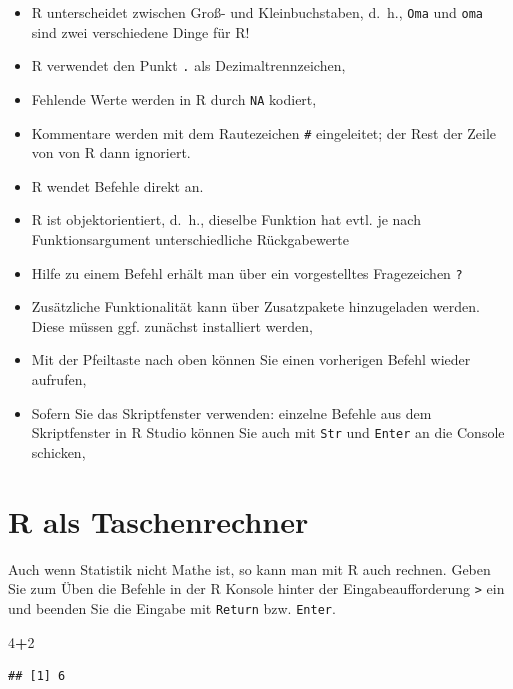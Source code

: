 \documentclass[12pt,ngerman,paper=a4,pagesize,DIV=13]{scrreprt}
\newenvironment{Shaded}{\begin{snugshade}}{\end{snugshade}}
\newcommand{\DecValTok}[1]{\textcolor[rgb]{0.00,0.00,0.81}{#1}}
\newcommand{\OperatorTok}[1]{\textcolor[rgb]{0.81,0.36,0.00}{\textbf{#1}}}
\providecommand{\tightlist}{%
  \setlength{\itemsep}{0pt}\setlength{\parskip}{0pt}}
\begin{document}
\begin{itemize}
\tightlist
\item
  R unterscheidet zwischen Groß- und Kleinbuchstaben, d.~h.,
  \texttt{Oma} und \texttt{oma} sind zwei verschiedene Dinge für R!
\item
  R verwendet den Punkt \texttt{.} als Dezimaltrennzeichen,
\item
  Fehlende Werte werden in R durch \texttt{NA} kodiert,
\item
  Kommentare werden mit dem Rautezeichen \texttt{\#} eingeleitet; der
  Rest der Zeile von von R dann ignoriert.
\item
  R wendet Befehle direkt an.
\item
  R ist objektorientiert, d.~h., dieselbe Funktion hat evtl. je nach
  Funktionsargument unterschiedliche Rückgabewerte
\item
  Hilfe zu einem Befehl erhält man über ein vorgestelltes Fragezeichen
  \texttt{?}
\item
  Zusätzliche Funktionalität kann über Zusatzpakete hinzugeladen werden.
  Diese müssen ggf. zunächst installiert werden,
\item
  Mit der Pfeiltaste nach oben können Sie einen vorherigen Befehl wieder
  aufrufen,
\item
  Sofern Sie das Skriptfenster verwenden: einzelne Befehle aus dem
  Skriptfenster in R Studio können Sie auch mit \texttt{Str} und
  \texttt{Enter} an die Console schicken,
\end{itemize}

\hypertarget{r-als-taschenrechner}{%
\section{R als Taschenrechner}\label{r-als-taschenrechner}}

Auch wenn Statistik nicht Mathe ist, so kann man mit R auch rechnen.
Geben Sie zum Üben die Befehle in der R Konsole hinter der
Eingabeaufforderung \texttt{\textgreater{}} ein und beenden Sie die
Eingabe mit \texttt{Return} bzw. \texttt{Enter}.

\begin{Shaded}
\begin{Highlighting}[]
\DecValTok{4}\OperatorTok{+}\DecValTok{2}
\end{Highlighting}
\end{Shaded}

\begin{verbatim}
## [1] 6
\end{verbatim}
\end{document}
